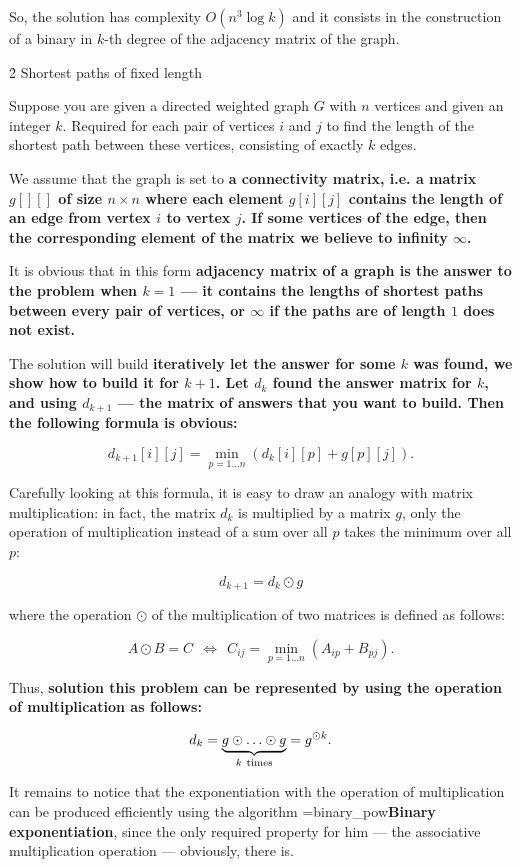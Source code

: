 So, the solution has complexity $O (n^3 \log k)$ and it consists in the construction of a binary in $k$-th degree of the adjacency matrix of the graph.


\h2{ Shortest paths of fixed length }

Suppose you are given a directed weighted graph $G$ with $n$ vertices and given an integer $k$. Required for each pair of vertices $i$ and $j$ to find the length of the shortest path between these vertices, consisting of exactly $k$ edges.

We assume that the graph is set to \bf{a connectivity matrix}, i.e. a matrix $g[][]$ of size $n \times n$ where each element $g[i][j]$ contains the length of an edge from vertex $i$ to vertex $j$. If some vertices of the edge, then the corresponding element of the matrix we believe to infinity $\infty$.

It is obvious that in this form \bf{adjacency matrix} of a graph is \bf{the answer to the problem when $k=1$} --- it contains the lengths of shortest paths between every pair of vertices, or $\infty$ if the paths are of length $1$ does not exist.

The solution will build \bf{iteratively} let the answer for some $k$ was found, we show how to build it for $k+1$. Let $d_k$ found the answer matrix for $k$, and using $d_{k+1}$ --- the matrix of answers that you want to build. Then the following formula is obvious:

$$ d_{k+1}[i][j] = \min_{p = 1 \ldots n} ( d_k[i][p] + g[p][j] ). $$

Carefully looking at this formula, it is easy to draw an analogy with matrix multiplication: in fact, the matrix $d_k$ is multiplied by a matrix $g$, only the operation of multiplication instead of a sum over all $p$ takes the minimum over all $p$:

$$ d_{k+1} = d_k \odot g $$

where the operation $\odot$ of the multiplication of two matrices is defined as follows:

$$ A \odot B = C \ \ \Longleftrightarrow\ \ C_{ij} = \min_{p=1 \ldots n} (A_{ip} + B_{pj}). $$

Thus, \bf{solution} this problem can be represented by using the operation of multiplication as follows:

$$ d_k = \underbrace{ g \odot \ldots \odot g}_{k\ {\rm times}} = g^{\odot k}. $$

It remains to notice that the exponentiation with the operation of multiplication can be produced efficiently using the algorithm \algohref=binary_pow{\bf{Binary exponentiation}}, since the only required property for him --- the associative multiplication operation --- obviously, there is.

